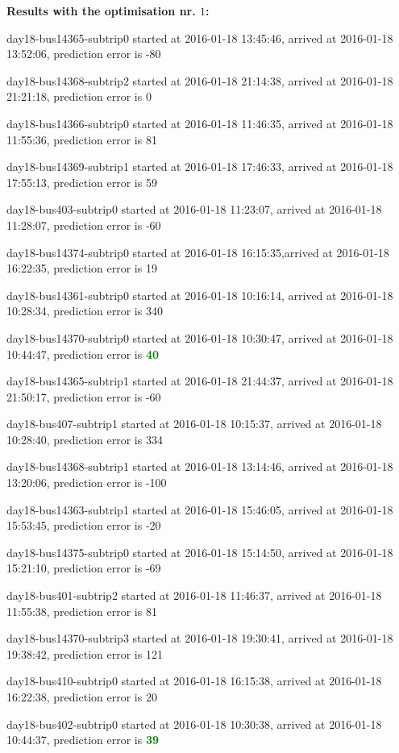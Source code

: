 \documentclass[12pt,a4paper,oneside,openright]{report}
\begin{document}
\textbf{Results with the optimisation nr. $1$:} \\
{\footnotesize
day18-bus14365-subtrip0 started at 2016-01-18 13:45:46, arrived at 2016-01-18 13:52:06, prediction error is -80

day18-bus14368-subtrip2 started at 2016-01-18 21:14:38, arrived at 2016-01-18 21:21:18, prediction error is 0

day18-bus14366-subtrip0 started at 2016-01-18 11:46:35, arrived at 2016-01-18 11:55:36, prediction error is 81

day18-bus14369-subtrip1 started at 2016-01-18 17:46:33, arrived at 2016-01-18 17:55:13, prediction error is 59

day18-bus403-subtrip0 started at 2016-01-18 11:23:07,    arrived at 2016-01-18 11:28:07, prediction error is -60

day18-bus14374-subtrip0 started at 2016-01-18 16:15:35,arrived at 2016-01-18 16:22:35, prediction error is 19

day18-bus14361-subtrip0 started at 2016-01-18 10:16:14, arrived at 2016-01-18 10:28:34, prediction error is 340

day18-bus14370-subtrip0 started at 2016-01-18 10:30:47, arrived at 2016-01-18 10:44:47, prediction error is \textcolor{green}{\textbf{40}}

day18-bus14365-subtrip1 started at 2016-01-18 21:44:37, arrived at 2016-01-18 21:50:17, prediction error is -60

day18-bus407-subtrip1 started at 2016-01-18 10:15:37,    arrived at 2016-01-18 10:28:40, prediction error is 334

day18-bus14368-subtrip1 started at 2016-01-18 13:14:46, arrived at 2016-01-18 13:20:06, prediction error is -100

day18-bus14363-subtrip1 started at 2016-01-18 15:46:05, arrived at 2016-01-18 15:53:45, prediction error is -20

day18-bus14375-subtrip0 started at 2016-01-18 15:14:50, arrived at 2016-01-18 15:21:10, prediction error is -69

day18-bus401-subtrip2 started at 2016-01-18 11:46:37,    arrived at 2016-01-18 11:55:38, prediction error is 81

day18-bus14370-subtrip3 started at 2016-01-18 19:30:41, arrived at 2016-01-18 19:38:42, prediction error is 121

day18-bus410-subtrip0 started at 2016-01-18 16:15:38,    arrived at 2016-01-18 16:22:38, prediction error is 20

day18-bus402-subtrip0 started at 2016-01-18 10:30:38,    arrived at 2016-01-18 10:44:37, prediction error is \textcolor{green}{\textbf{39}}

}
\end{document}
